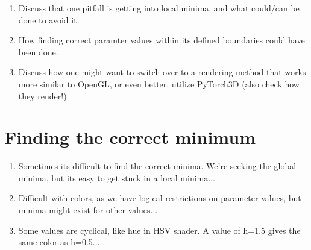 \begin{enumerate}
    \item Discuss that one pitfall is getting into local minima, and what could/can be done to avoid it.
    \item How finding correct paramter values within its defined boundaries could have been done. 
    \item Discuss how one might want to switch over to a rendering method that works more similar to OpenGL, or even better, utilize PyTorch3D (also check how they render!)
\end{enumerate}

\section{Finding the correct minimum}
\begin{enumerate}
    \item Sometimes its difficult to find the correct minima. We're seeking the global minima, but its easy to get stuck in a local minima...
    \item Difficult with colors, as we have logical restrictions on parameter values, but minima might exist for other values...
    \item Some values are cyclical, like hue in HSV shader. A value of h=1.5 gives the same color as h=0.5...
\end{enumerate}